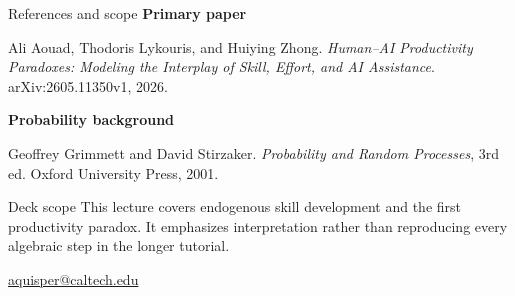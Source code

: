 \documentclass[aspectratio=169,11pt]{beamer}
\begin{document}
\begin{frame}{References and scope}
\small
\textbf{Primary paper}

Ali Aouad, Thodoris Lykouris, and Huiying Zhong.
\emph{Human--AI Productivity Paradoxes: Modeling the Interplay of Skill, Effort, and AI Assistance}.
arXiv:2605.11350v1, 2026.

\vspace{5mm}
\textbf{Probability background}

Geoffrey Grimmett and David Stirzaker.
\emph{Probability and Random Processes}, 3rd ed. Oxford University Press, 2001.

\vspace{5mm}
\begin{block}{Deck scope}
This lecture covers endogenous skill development and the first productivity paradox. It emphasizes interpretation rather than reproducing every algebraic step in the longer tutorial.
\end{block}
\vfill
\centering
\href{mailto:aquisper@caltech.edu}{aquisper@caltech.edu}
\end{frame}
\end{document}
